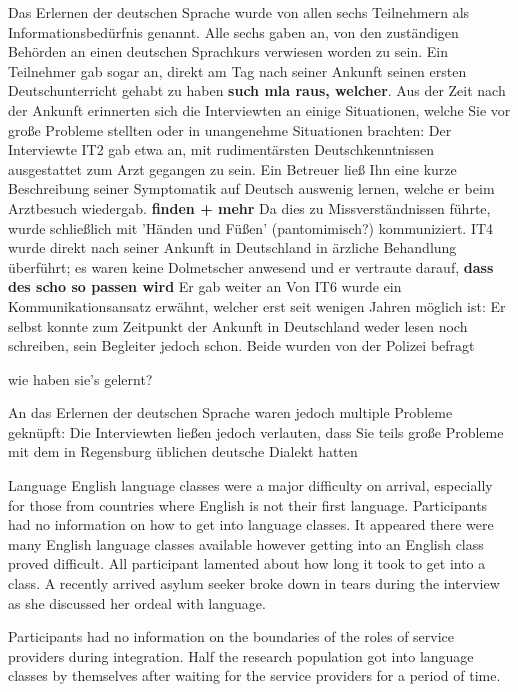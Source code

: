 Das Erlernen der deutschen Sprache wurde von allen sechs Teilnehmern als Informationsbedürfnis genannt. Alle sechs gaben an, von den zuständigen Behörden an einen deutschen Sprachkurs verwiesen worden zu sein. Ein Teilnehmer gab sogar an, direkt am Tag nach seiner Ankunft seinen ersten Deutschunterricht gehabt zu haben \textbf{such mla raus, welcher}.\newline
Aus der Zeit nach der Ankunft erinnerten sich die Interviewten an einige Situationen, welche Sie vor große Probleme stellten oder in unangenehme Situationen brachten:\newline
Der Interviewte IT2 gab etwa an, mit rudimentärsten Deutschkenntnissen ausgestattet zum Arzt gegangen zu sein. Ein Betreuer ließ Ihn eine kurze Beschreibung seiner Symptomatik auf Deutsch auswenig lernen, welche er beim Arztbesuch wiedergab. \textbf{finden + mehr} Da dies zu Missverständnissen führte, wurde schließlich mit 'Händen und Füßen' (pantomimisch?) kommuniziert.\newline
IT4 wurde direkt nach seiner Ankunft in Deutschland in ärzliche Behandlung überführt; es waren keine Dolmetscher anwesend und er vertraute darauf, \textbf{dass des scho so passen wird}
Er gab weiter an
Von IT6 wurde ein Kommunikationsansatz erwähnt, welcher erst seit wenigen Jahren möglich ist:\newline
Er selbst konnte zum Zeitpunkt der Ankunft in Deutschland weder lesen noch schreiben, sein Begleiter jedoch schon. Beide wurden von der Polizei befragt

wie haben sie's gelernt?



An das Erlernen der deutschen Sprache waren jedoch multiple Probleme geknüpft:
Die Interviewten ließen jedoch verlauten, dass Sie teils große Probleme mit dem in Regensburg üblichen deutsche Dialekt hatten


Language
English language classes were a major difficulty on arrival,
especially for those from countries where English is not
their first language. Participants had no information on how
to get into language classes. It appeared there were many
English language classes available however getting into an
English class proved difficult. All participant lamented
about how long it took to get into a class. A recently arrived
asylum seeker broke down in tears during the interview as
she discussed her ordeal with language.

Participants had no information on the boundaries of the
roles of service providers during integration. Half the
research population got into language classes by themselves
after waiting for the service providers for a period of time.


